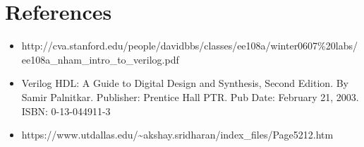 \documentclass[a4paper,10pt]{article}
\theoremstyle{mytheor}
\begin{document}
\section*{References}
\begin{itemize}
  \small 
  \item http://cva.stanford.edu/people/davidbbs/classes/ee108a/winter0607\%20labs/ee108a\_nham\_intro\_to\_verilog.pdf
  \item Verilog HDL: A Guide to Digital Design and Synthesis, Second Edition. By Samir Palnitkar. Publisher: Prentice Hall PTR. Pub Date: February 21, 2003. ISBN: 0-13-044911-3
  \item https://www.utdallas.edu/{\textasciitilde}akshay.sridharan/index\_files/Page5212.htm
\end{itemize}
\end{document}
